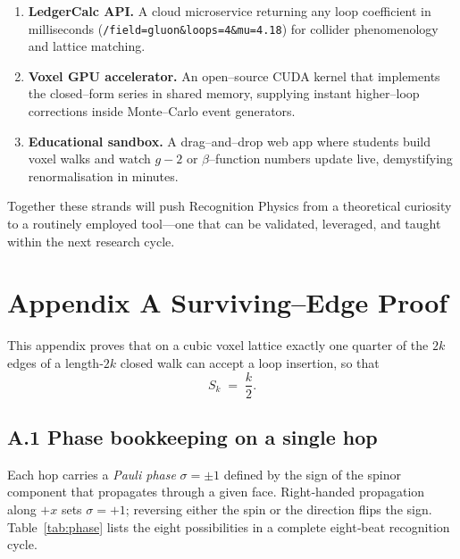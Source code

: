 \documentclass[11pt]{article}
\begin{document}
\begin{enumerate}\setlength\itemsep{0.35em}
\item \textbf{LedgerCalc API.}\;
      A cloud microservice returning any loop coefficient in
      milliseconds (\texttt{/field=gluon\&loops=4\&mu=4.18}) for
      collider phenomenology and lattice matching.

\item \textbf{Voxel GPU accelerator.}\;
      An open–source CUDA kernel that implements the closed–form series
      in shared memory, supplying instant higher–loop corrections inside
      Monte–Carlo event generators.

\item \textbf{Educational sandbox.}\;
      A drag–and–drop web app where students build voxel walks and watch
      $g\!-\!2$ or $\beta$–function numbers update live, demystifying
      renormalisation in minutes.
\end{enumerate}

\noindent
Together these strands will push Recognition Physics from a theoretical
curiosity to a routinely employed tool—one that can be validated,
leveraged, and taught within the next research cycle.

\appendix
\section*{Appendix A \; Surviving–Edge Proof}\label{app:edges}

\renewcommand{\thesubsection}{A.\arabic{subsection}}

This appendix proves that on a cubic voxel lattice exactly one quarter of
the $2k$ edges of a length‐$2k$ closed walk can accept a loop insertion,
so that
\[
   S_{k} \;=\; \frac{k}{2}.
   \tag{A.1}
\]

\subsection{A.1 \; Phase bookkeeping on a single hop}

Each hop carries a \emph{Pauli phase}
\(\sigma=\pm 1\) defined by the sign of the spinor component that
propagates through a given face.  
Right‐handed propagation along $+x$ sets \(\sigma=+1\); reversing either
the spin or the direction flips the sign.  
Table~\ref{tab:phase} lists the eight possibilities in a complete
eight‐beat recognition cycle.
\end{document}

